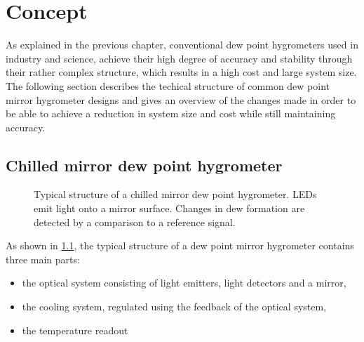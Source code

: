 \chapter{Concept}
\label{s:concept}
As explained in the previous chapter, conventional dew point hygrometers used in industry and science, achieve their high degree of accuracy and stability through their rather complex structure, which results in a high cost and large system size. The following section describes the techical structure of common dew point mirror hygrometer designs  and gives an overview of the changes made in order to be able to achieve a reduction in system size and cost while still maintaining accuracy.

\section{Chilled mirror dew point hygrometer}

\begin{figure}[bt]
    \centering
    
    \caption{Typical structure of a chilled mirror dew point hygrometer. LEDs emit light onto a mirror surface. Changes in dew formation are detected by a comparison to a reference signal.}
    \label{d:hygrometer}
\end{figure}


As shown in \cref{d:hygrometer}, the typical structure of a dew point mirror hygrometer contains three main parts: 
\begin{itemize}
    \item the optical system consisting of light emitters, light detectors and a mirror,
    \item the cooling system, regulated using the feedback of the optical system,
    \item the temperature readout
\end{itemize}

